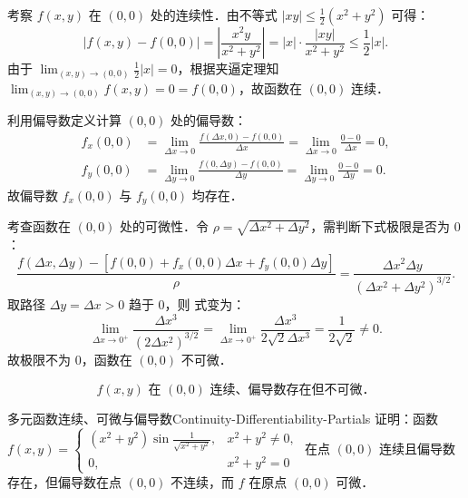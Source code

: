 \begin{myproof}
    考察 $f(x, y)$ 在 $(0, 0)$ 处的连续性．由不等式 $|xy| \leq \frac{1}{2}(x^2 + y^2)$ 可得：
    \begin{equation}
        |f(x, y) - f(0, 0)| = \left| \frac{x^2 y}{x^2 + y^2} \right| = |x| \cdot \frac{|xy|}{x^2 + y^2} \leq \frac{1}{2} |x|.
    \end{equation}
    由于 $\lim_{(x, y) \to (0, 0)} \frac{1}{2} |x| = 0$，根据夹逼定理知 $\lim_{(x, y) \to (0, 0)} f(x, y) = 0 = f(0, 0)$，故函数在 $(0, 0)$ 连续．

    利用偏导数定义计算 $(0, 0)$ 处的偏导数：
    \begin{equation}
        \begin{aligned}
            f_x(0, 0) & = \lim_{\Delta x \to 0} \frac{f(\Delta x, 0) - f(0, 0)}{\Delta x} = \lim_{\Delta x \to 0} \frac{0 - 0}{\Delta x} = 0, \\
            f_y(0, 0) & = \lim_{\Delta y \to 0} \frac{f(0, \Delta y) - f(0, 0)}{\Delta y} = \lim_{\Delta y \to 0} \frac{0 - 0}{\Delta y} = 0.
        \end{aligned}
    \end{equation}
    故偏导数 $f_x(0, 0)$ 与 $f_y(0, 0)$ 均存在．

    考查函数在 $(0, 0)$ 处的可微性．令 $\rho = \sqrt{\Delta x^2 + \Delta y^2}$，需判断下式极限是否为 $0$：
    \begin{equation}
        \frac{f(\Delta x, \Delta y) - [f(0, 0) + f_x(0, 0)\Delta x + f_y(0, 0)\Delta y]}{\rho} = \frac{\Delta x^2 \Delta y}{(\Delta x^2 + \Delta y^2)^{3/2}}.
        \label{eq:diff-limit}
    \end{equation}
    取路径 $\Delta y = \Delta x > 0$ 趋于 $0$，则  式变为：
    \begin{equation}
        \lim_{\Delta x \to 0^+} \frac{\Delta x^3}{(2 \Delta x^2)^{3/2}} = \lim_{\Delta x \to 0^+} \frac{\Delta x^3}{2\sqrt{2} \Delta x^3} = \frac{1}{2\sqrt{2}} \neq 0.
    \end{equation}
    故极限不为 $0$，函数在 $(0, 0)$ 不可微．

    \begin{equation}
        \boxed{f(x, y) \text{ 在 } (0, 0) \text{ 连续、偏导数存在但不可微．}}
    \end{equation}
\end{myproof}


\begin{problem}{多元函数连续、可微与偏导数}{Continuity-Differentiability-Partials}
    证明：函数 $f(x,y) = \begin{cases} (x^2 + y^2) \sin \frac{1}{\sqrt{x^2+y^2}}, & x^2 + y^2 \neq 0, \\ 0, & x^2 + y^2 = 0 \end{cases}$ 在点 $(0,0)$ 连续且偏导数存在，但偏导数在点 $(0,0)$ 不连续，而 $f$ 在原点 $(0,0)$ 可微．
\end{problem}

